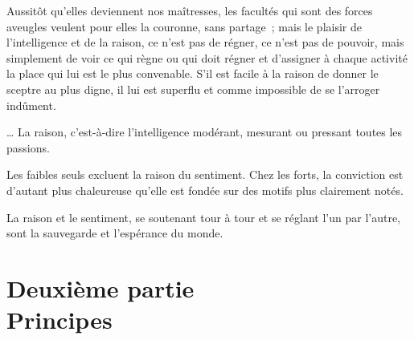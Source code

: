 \documentclass[french,twoside]{book} %
\newcommand{\astermono}{\medskip\centerline{\color{rubric}\large\selectfont{\syms ✻}}\medskip\par}%
\newcommand\chapteropen{} %
\newcommand\chaptercont{} %
\newcommand\chapterclose{} %
\begin{document}
\astermono

\noindent Aussitôt qu’elles deviennent nos maîtresses, les facultés qui sont des forces aveugles veulent pour elles la couronne, sans partage ; mais le plaisir de l’intelligence et de la raison, ce n’est pas de régner, ce n’est pas de pouvoir, mais simplement de voir ce qui règne ou qui doit régner et d’assigner à chaque activité la place qui lui est le plus convenable. S’il est facile à la raison de donner le sceptre au plus digne, il lui est superflu et comme impossible de se l’arroger indûment.\par

\astermono

\noindent … La raison, c’est-à-dire l’intelligence modérant, mesurant ou pressant toutes les passions.\par

\astermono

\noindent Les faibles seuls excluent la raison du sentiment. Chez les forts, la conviction est d’autant plus chaleureuse qu’elle est fondée sur des motifs plus clairement notés.\par

\astermono

\noindent La raison et le sentiment, se soutenant tour à tour et se réglant l’un par l’autre, sont la sauvegarde et l’espérance du monde.
\chapterclose


\chapteropen
\chapter[{Deuxième partie. Principes}]{Deuxième partie \\
Principes}\renewcommand{\leftmark}{Deuxième partie \\
Principes}


\chaptercont
\end{document}
